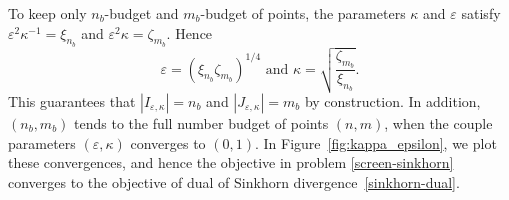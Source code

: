 To keep only $n_b$-budget and $m_b$-budget of points, the parameters $\kappa$ and $\varepsilon$ satisfy ${\varepsilon^2}\kappa^{-1} = \xi_{n_b}$ and $\varepsilon^2\kappa = \zeta_{m_b}$. Hence 
\begin{equation}
\label{epsilon_kappa}
 \varepsilon = (\xi_{n_b}\zeta_{m_b})^{1/4} \text{ and } \kappa = \sqrt{\frac{\zeta_{m_b}}{\xi_{n_b}}}.
\end{equation}
This guarantees that $|I_{\varepsilon, \kappa}| = n_b$ and $|J_{\varepsilon, \kappa}| = m_b$ by construction. In addition,  $(n_b,m_b)$ tends to the full number budget of points $(n,m)$, when the couple parameters $(\varepsilon, \kappa)$ converges to $(0,1)$. 
In Figure~\ref{fig:kappa_epsilon}, we plot these convergences, and hence the objective in problem \eqref{screen-sinkhorn} converges to the objective of dual of Sinkhorn divergence~\eqref{sinkhorn-dual}.

